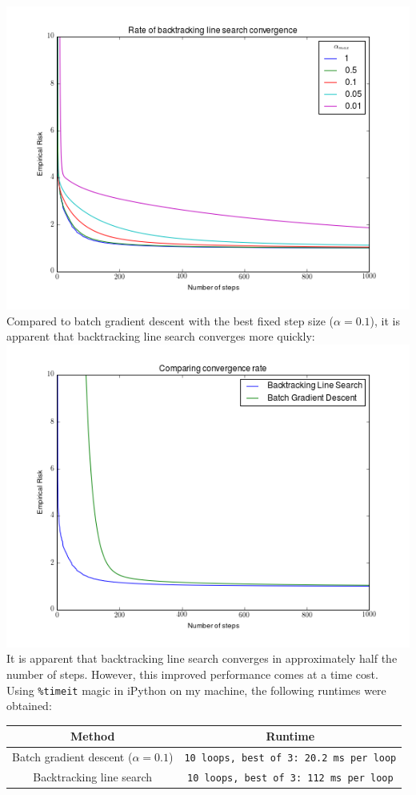 \documentclass[paper=a4, fontsize=11pt]{scrartcl} %
\numberwithin{equation}{section} %
\numberwithin{figure}{section} %
\numberwithin{table}{section} %
\begin{document}
\includegraphics[scale=.65]{./../figures/2_4_3.png} \\
Compared to batch gradient descent with the best fixed step size ($\alpha = 0.1$), it is apparent that backtracking line search converges more quickly:\\
\includegraphics[scale=.65]{./../figures/2_4_3a.png} \\

It is apparent that backtracking line search converges in approximately half the number of steps. However, this improved performance comes at a time cost. Using \texttt{\%timeit} magic in iPython on my machine, the following runtimes were obtained: \\
\begin{center}
\begin{tabular}{|c | c |}
\hline
Method & Runtime \\
\hline
Batch gradient descent ($\alpha = 0.1$) & \texttt{10 loops, best of 3: 20.2 ms per loop} \\
\hline
Backtracking line search & \texttt{10 loops, best of 3: 112 ms per loop} \\
\hline
\end{tabular} \\
\end{center}
 
\end{document}
